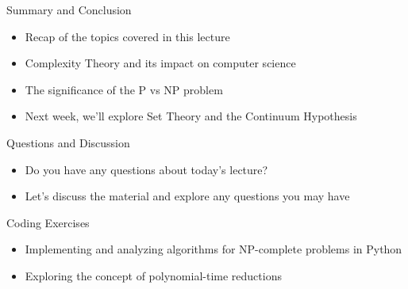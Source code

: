\documentclass[presentation]{beamer}
\begin{document}
\begin{frame}[label={sec:org817c8eb}]{Summary and Conclusion}
\begin{itemize}
\item Recap of the topics covered in this lecture
\item Complexity Theory and its impact on computer science
\item The significance of the P vs NP problem
\item Next week, we'll explore Set Theory and the Continuum Hypothesis
\end{itemize}
\end{frame}

\begin{frame}[label={sec:org4a1b05b}]{Questions and Discussion}
\begin{itemize}
\item Do you have any questions about today's lecture?
\item Let's discuss the material and explore any questions you may have
\end{itemize}
\end{frame}

\begin{frame}[label={sec:orge78579d}]{Coding Exercises}
\begin{itemize}
\item Implementing and analyzing algorithms for NP-complete problems in Python
\item Exploring the concept of polynomial-time reductions
\end{itemize}
\end{frame}
\end{document}
